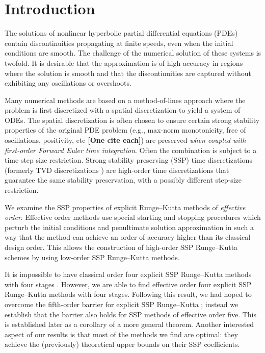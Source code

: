 \section{Introduction}\label{sec:Intro}

The solutions of nonlinear hyperbolic partial differential equations (PDEs) contain discontinuities propagating at finite speeds, even when the initial conditions are smooth.
The challenge of the numerical solution of these systems is twofold.
It is desirable that the approximation is of high accuracy in regions where the solution is smooth and that the discontinuities are captured without exhibiting any oscillations or overshoots.

Many numerical methods are based on a method-of-lines approach where the problem is first discretized with a spatial discretization to yield a system of ODEs.
The spatial discretization is often chosen to ensure certain strong stability properties of the original PDE problem (e.g., max-norm monotonicity, free of oscillations, positivity, etc {\bf [One cite each]}) are preserved \emph{when coupled with first-order Forward Euler time integration}.
Often the combination is subject to a time step size restriction.
Strong stability preserving (SSP) time discretizations (formerly TVD
discretizations \cite{Gottlieb1998}) are high-order time
discretizations that guarantee the same stability preservation, with a
possibly different step-size restriction.


We examine the SSP properties of explicit Runge--Kutta methods of
\emph{effective order}.
Effective order methods use special starting and stopping procedures
which perturb the initial conditions and penultimate solution
approximation in such a way that the method can achieve an order of
accuracy higher than its classical design order.
This allows the construction of high-order SSP Runge--Kutta schemes by
using low-order SSP Runge--Kutta methods.


It is impossible to have classical order four explicit SSP
Runge--Kutta methods with four stages \cite{Gottlieb1998}.  However, we
are able to find effective order four explicit SSP Runge--Kutta
methods with four stages.
Following this result, we had hoped to overcome the fifth-order
barrier for explicit SSP Runge--Kutta \cite{Ruuth2002}; instead we
establish that the barrier also holds for SSP methods of effective
order five.
This is established later as a corollary of a more general theorem.
Another interested aspect of our results is that most of the methods
we find are optimal: they achieve the (previously) theoretical upper
bounds on their SSP coefficients.

